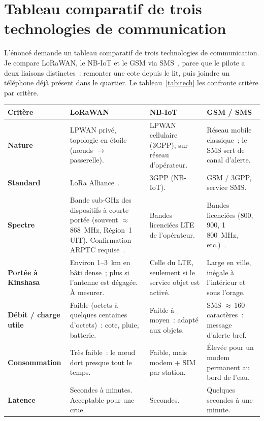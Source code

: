\documentclass[12pt,a4paper]{article}
\begin{document}
\clearpage
\section{Tableau comparatif de trois technologies de communication}
\label{sec:tech}

L'énoncé demande un tableau comparatif de trois technologies de communication. Je compare LoRaWAN, le NB-IoT et le GSM via SMS~\cite{lora,uit2018}, parce que le pilote a deux liaisons distinctes~: remonter une cote depuis le lit, puis joindre un téléphone déjà présent dans le quartier. Le tableau~\ref{tab:tech} les confronte critère par critère.

\begin{table}[H]
\centering
\scriptsize
\renewcommand{\arraystretch}{1.08}
\begin{tabularx}{\textwidth}{@{}>{\raggedright\arraybackslash\bfseries}p{2.85cm}>{\raggedright\arraybackslash}X>{\raggedright\arraybackslash}X>{\raggedright\arraybackslash}X@{}}
\toprule
Critère & LoRaWAN & NB-IoT & GSM / SMS \\
\midrule
Nature & LPWAN privé, topologie en étoile (nœuds $\rightarrow$ passerelle). & LPWAN cellulaire (3GPP), sur réseau d'opérateur. & Réseau mobile classique~; le SMS sert de canal d'alerte. \\
\addlinespace
Standard & LoRa Alliance~\cite{lora}. & 3GPP (NB-IoT). & GSM / 3GPP, service SMS. \\
\addlinespace
Spectre & Bande sub-GHz des dispositifs à courte portée (souvent $\approx$\,868~MHz, Région~1 UIT). Confirmation ARPTC requise~\cite{uit2018,eleos}. & Bandes licenciées LTE de l'opérateur. & Bandes licenciées (800, 900, 1\,800~MHz, etc.)~\cite{arptc2025}. \\
\addlinespace
Portée à Kinshasa & Environ 1--3~km en bâti dense~; plus si l'antenne est dégagée. À mesurer. & Celle du LTE, seulement si le service objet est activé. & Large en ville, inégale à l'intérieur et sous l'orage. \\
\addlinespace
Débit / charge utile & Faible (octets à quelques centaines d'octets)~: cote, pluie, batterie. & Faible à moyen~: adapté aux objets. & SMS $\approx$\,160 caractères~: message d'alerte bref. \\
\addlinespace
Consommation & Très faible~: le nœud dort presque tout le temps. & Faible, mais modem + SIM par station. & Élevée pour un modem permanent au bord de l'eau. \\
\addlinespace
Latence & Secondes à minutes. Acceptable pour une crue. & Secondes. & Quelques secondes à une minute. \\

\end{tabularx}
\end{table}
\end{document}
